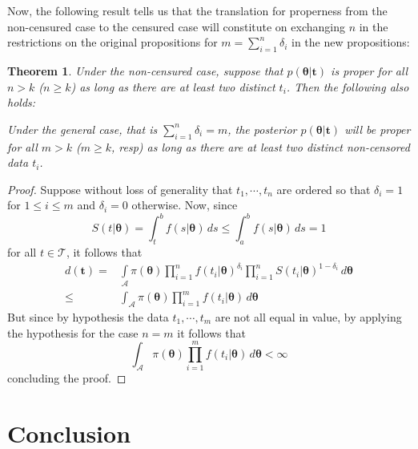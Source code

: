 \documentclass[]{interact}
\newcommand{\bs}{\boldsymbol}
\theoremstyle{plain}%
\newtheorem{theorem}{Theorem}[section]
\theoremstyle{definition}
\theoremstyle{remark}
\begin{document}
Now, the following result tells us that the translation for properness from the non-censured case to the censured case will constitute on exchanging $n$ in the restrictions on the original propositions for $m=\sum_{i=1}^n \delta_i$ in the new propositions:

\begin{theorem}\label{theorem-22}  Under the non-censured case, suppose that $p(\bs{\theta}|\bs{t})$ is proper for all $n> k$ ($n\geq k$) as long as there are at least two distinct $t_i$. Then the following also holds:

Under the general case, that is
$\sum_{i=1}^n \delta_i = m$, the posterior $p(\bs{\theta}|\bs{t})$ will be proper for all $m> k$ ($m\geq k$, resp) as long as there are at least two distinct non-censored data $t_i$.
\end{theorem}


\begin{proof} Suppose without loss of generality that $t_1,\cdots,t_n$ are ordered so that $\delta_i=1$ for $1\leq i\leq m$ and $\delta_i=0$ otherwise. Now, since 
\begin{equation*}S(t|\bs{\theta})=\int_t^b f(s|\bs{\theta})\, ds \leq \int_a^b f(s|\bs{\theta})\, ds = 1
\end{equation*}
for all $t\in \mathcal{T}$, it follows that
 \begin{equation*}
 \begin{aligned}
d(\bs{t})=  &\int\limits_{\mathcal{A}}\pi(\bs{\theta})\prod_{i=1}^n f(t_i|\bs{\theta})^{\delta_i}\prod_{i=1}^n S(t_i|\bs{\theta})^{1-\delta_i}\, d\bs{\theta}\\
\leq & \int_{\mathcal{A}}\pi(\bs{\theta})\prod_{i=1}^m f(t_i|\bs{\theta})\, d\bs{\theta}
\end{aligned}
\end{equation*}
But since by hypothesis the data $t_1,\cdots,t_m$ are not all equal in value, by applying the hypothesis for the case $n=m$ it follows that
\begin{equation*}\int_{\mathcal{A}}\pi(\bs{\theta})\prod_{i=1}^m f(t_i|\bs{\theta})\, d\bs{\theta}< \infty
\end{equation*}
concluding the proof.
\end{proof}


\section{Conclusion}
\end{document}
